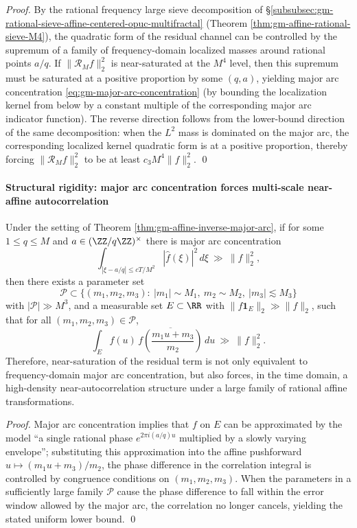 \begin{proof}
By the rational frequency large sieve decomposition of \S\ref{subsubsec:gm-rational-sieve-affine-centered-opuc-multifractal} (Theorem \ref{thm:gm-affine-rational-sieve-M4}), the quadratic form of the residual channel can be controlled by the supremum of a family of frequency-domain localized masses around rational points \(a/q\).
If \(\|\mathcal{R}_M f\|_2^2\) is near-saturated at the \(M^4\) level, then this supremum must be saturated at a positive proportion by some \((q,a)\), yielding major arc concentration \eqref{eq:gm-major-arc-concentration} (by bounding the localization kernel from below by a constant multiple of the corresponding major arc indicator function).
The reverse direction follows from the lower-bound direction of the same decomposition: when the \(L^2\) mass is dominated on the major arc, the corresponding localized kernel quadratic form is at a positive proportion, thereby forcing \(\|\mathcal{R}_M f\|_2^2\) to be at least \(c_3M^4\|f\|_2^2\). \qed
\end{proof}

\paragraph{Structural rigidity: major arc concentration forces multi-scale near-affine autocorrelation}
\begin{proposition}\label{prop:gm-major-arc-rigidity-affine-autocorr}
Under the setting of Theorem \ref{thm:gm-affine-inverse-major-arc}, if for some \(1\le q\le M\) and \(a\in(\ZZ/q\ZZ)^\times\) there is major arc concentration
\[
\int_{|\xi-a/q|\le cT/M^{2}} |\widehat f(\xi)|^2\,d\xi\ \gg\ \|f\|_2^2,
\]
then there exists a parameter set
\[
\mathcal{P}\subset\{(m_1,m_2,m_3):\ |m_1|\sim M_1,\ m_2\sim M_2,\ |m_3|\lesssim M_3\}
\]
with \(|\mathcal{P}|\gg M^3\), and a measurable set \(E\subset\RR\) with \(\|f\mathbf{1}_E\|_2\gg \|f\|_2\), such that for all \((m_1,m_2,m_3)\in\mathcal{P}\),
\[
\int_E f(u)\,\overline{f\!\left(\frac{m_1u+m_3}{m_2}\right)}\,du\ \gg\ \|f\|_2^2.
\]
Therefore, near-saturation of the residual term is not only equivalent to frequency-domain major arc concentration, but also forces, in the time domain, a high-density near-autocorrelation structure under a large family of rational affine transformations.
\end{proposition}

\begin{proof}
Major arc concentration implies that \(f\) on \(E\) can be approximated by the model ``a single rational phase \(e^{2\pi i(a/q)u}\) multiplied by a slowly varying envelope''; substituting this approximation into the affine pushforward \(u\mapsto(m_1u+m_3)/m_2\), the phase difference in the correlation integral is controlled by congruence conditions on \((m_1,m_2,m_3)\).
When the parameters in a sufficiently large family \(\mathcal{P}\) cause the phase difference to fall within the error window allowed by the major arc, the correlation no longer cancels, yielding the stated uniform lower bound. \qed
\end{proof}


